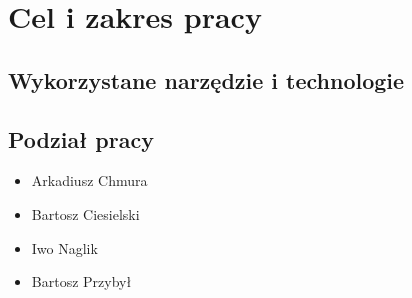 \chapter{Cel i zakres pracy}
\section{Wykorzystane narzędzie i technologie}
\section{Podział pracy}
\begin{itemize}
    \item Arkadiusz Chmura
    \item Bartosz Ciesielski
    \item Iwo Naglik
    \item Bartosz Przybył
\end{itemize}